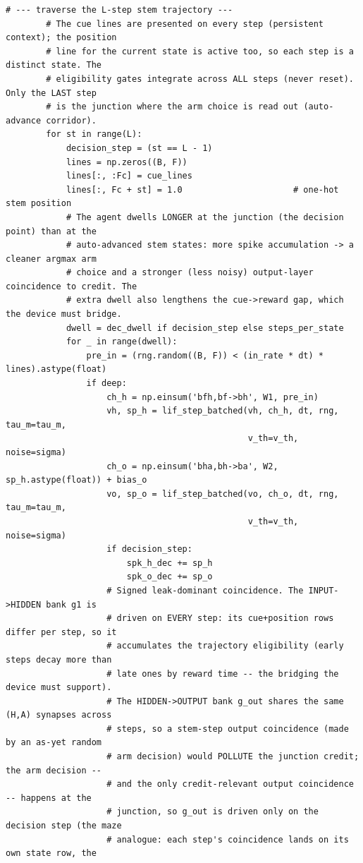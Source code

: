 \begin{lstlisting}[caption={mrl\_trace/deep\_sequential.py},label={lst:siox-src-deep_sequential}]
        # --- traverse the L-step stem trajectory ---
        # The cue lines are presented on every step (persistent context); the position
        # line for the current state is active too, so each step is a distinct state. The
        # eligibility gates integrate across ALL steps (never reset). Only the LAST step
        # is the junction where the arm choice is read out (auto-advance corridor).
        for st in range(L):
            decision_step = (st == L - 1)
            lines = np.zeros((B, F))
            lines[:, :Fc] = cue_lines
            lines[:, Fc + st] = 1.0                      # one-hot stem position
            # The agent dwells LONGER at the junction (the decision point) than at the
            # auto-advanced stem states: more spike accumulation -> a cleaner argmax arm
            # choice and a stronger (less noisy) output-layer coincidence to credit. The
            # extra dwell also lengthens the cue->reward gap, which the device must bridge.
            dwell = dec_dwell if decision_step else steps_per_state
            for _ in range(dwell):
                pre_in = (rng.random((B, F)) < (in_rate * dt) * lines).astype(float)
                if deep:
                    ch_h = np.einsum('bfh,bf->bh', W1, pre_in)
                    vh, sp_h = lif_step_batched(vh, ch_h, dt, rng, tau_m=tau_m,
                                                v_th=v_th, noise=sigma)
                    ch_o = np.einsum('bha,bh->ba', W2, sp_h.astype(float)) + bias_o
                    vo, sp_o = lif_step_batched(vo, ch_o, dt, rng, tau_m=tau_m,
                                                v_th=v_th, noise=sigma)
                    if decision_step:
                        spk_h_dec += sp_h
                        spk_o_dec += sp_o
                    # Signed leak-dominant coincidence. The INPUT->HIDDEN bank g1 is
                    # driven on EVERY step: its cue+position rows differ per step, so it
                    # accumulates the trajectory eligibility (early steps decay more than
                    # late ones by reward time -- the bridging the device must support).
                    # The HIDDEN->OUTPUT bank g_out shares the same (H,A) synapses across
                    # steps, so a stem-step output coincidence (made by an as-yet random
                    # arm decision) would POLLUTE the junction credit; the arm decision --
                    # and the only credit-relevant output coincidence -- happens at the
                    # junction, so g_out is driven only on the decision step (the maze
                    # analogue: each step's coincidence lands on its own state row, the

\end{lstlisting}
